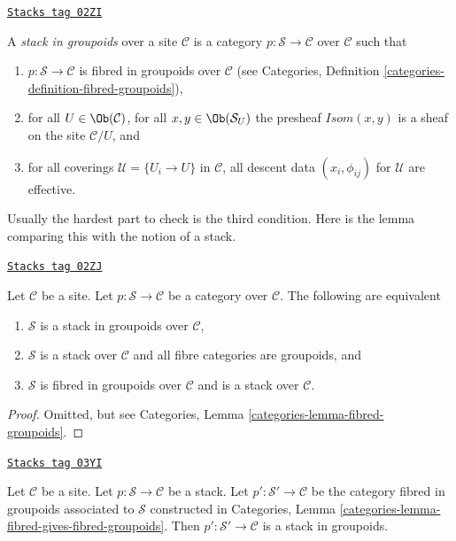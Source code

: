 \begin{definition}
\label{stacks-definition-stack-in-groupoids}
\href{https://stacks.math.columbia.edu/tag/02ZI}{\texttt{Stacks tag 02ZI}}

A {\it stack in groupoids} over a site $\mathcal{C}$ is a
category $p : \mathcal{S} \to \mathcal{C}$ over $\mathcal{C}$
such that
\begin{enumerate}
\item $p : \mathcal{S} \to \mathcal{C}$ is fibred
in groupoids over $\mathcal{C}$ (see
Categories, Definition \ref{categories-definition-fibred-groupoids}),
\item for all $U \in \Ob(\mathcal{C})$,
for all $x, y\in \Ob(\mathcal{S}_U)$ the presheaf
$\mathit{Isom}(x, y)$ is a sheaf on the site $\mathcal{C}/U$, and
\item for all coverings $\mathcal{U} = \{U_i \to U\}$ in $\mathcal{C}$,
all descent data $(x_i, \phi_{ij})$ for $\mathcal{U}$ are effective.
\end{enumerate}
\end{definition}

Usually the hardest part to check is the third condition.
Here is the lemma comparing this with the notion of a stack.

\begin{lemma}
\label{stacks-lemma-stack-in-groupoids-stack}
\href{https://stacks.math.columbia.edu/tag/02ZJ}{\texttt{Stacks tag 02ZJ}}

Let $\mathcal{C}$ be a site.
Let $p : \mathcal{S} \to \mathcal{C}$ be a category over $\mathcal{C}$.
The following are equivalent
\begin{enumerate}
\item $\mathcal{S}$ is a stack in groupoids over $\mathcal{C}$,
\item $\mathcal{S}$ is a stack over $\mathcal{C}$ and all
fibre categories are groupoids, and
\item $\mathcal{S}$ is fibred in groupoids over $\mathcal{C}$
and is a stack over $\mathcal{C}$.
\end{enumerate}
\end{lemma}

\begin{proof}
Omitted, but see Categories, Lemma \ref{categories-lemma-fibred-groupoids}.
\end{proof}

\begin{lemma}
\label{stacks-lemma-stack-gives-stack-groupoids}
\href{https://stacks.math.columbia.edu/tag/03YI}{\texttt{Stacks tag 03YI}}

Let $\mathcal{C}$ be a site.
Let $p : \mathcal{S} \to \mathcal{C}$ be a stack.
Let $p' : \mathcal{S}' \to \mathcal{C}$
be the category fibred in groupoids associated to $\mathcal{S}$
constructed in
Categories, Lemma \ref{categories-lemma-fibred-gives-fibred-groupoids}.
Then $p' : \mathcal{S}' \to \mathcal{C}$ is a stack in groupoids.
\end{lemma}

